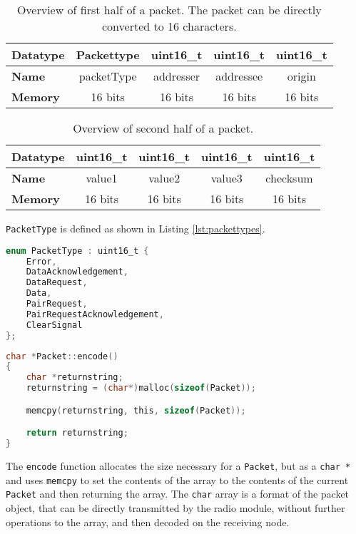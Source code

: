 \begin{table}[]
\centering
\begin{tabular}{|l|c|l|c|l|c|l|c|l|}
\hline
\textbf{Datatype} & \multicolumn{2}{c|}{Packettype}      & \multicolumn{2}{c|}{uint16\_t}       & \multicolumn{2}{c|}{uint16\_t}       & \multicolumn{2}{c|}{uint16\_t}       \\ \hline
\textbf{Name}     & \multicolumn{2}{c|}{packetType}      & \multicolumn{2}{c|}{addresser}       & \multicolumn{2}{c|}{addressee}       & \multicolumn{2}{c|}{origin}          \\ \hline
\textbf{Memory}   & \multicolumn{2}{c|}{16 bits} & \multicolumn{2}{c|}{16 bits} & \multicolumn{2}{c|}{16 bits} & \multicolumn{2}{c|}{16 bits} \\ \hline
\end{tabular}
\caption{Overview of first half of a packet. The packet can be directly converted to 16 characters.}
\label{tab:packetTableFirst}
\end{table}

\begin{table}[]
\centering
\begin{tabular}{|l|c|l|c|l|c|l|c|l|}
\hline
\textbf{Datatype} & \multicolumn{2}{c|}{uint16\_t}       & \multicolumn{2}{c|}{uint16\_t}       & \multicolumn{2}{l|}{uint16\_t} & \multicolumn{2}{c|}{uint16\_t}       \\ \hline
\textbf{Name}     & \multicolumn{2}{c|}{value1}         & \multicolumn{2}{c|}{value2}         & \multicolumn{2}{c|}{value3}   & \multicolumn{2}{c|}{checksum}        \\ \hline
\textbf{Memory}   & \multicolumn{2}{c|}{16 bits} & \multicolumn{2}{c|}{16 bits} & \multicolumn{2}{c|}{16 bits} & \multicolumn{2}{c|}{16 bits} \\ \hline
\end{tabular}
\caption{Overview of second half of a packet.}
\label{tab:packetTableSecond}
\end{table}

\texttt{PacketType} is defined as shown in Listing \ref{lst:packettypes}.
\begin{lstlisting}[language=C,label={lst:packettypes},caption={Packet types}]
enum PacketType : uint16_t {
    Error,
    DataAcknowledgement,
    DataRequest,
    Data,
    PairRequest,
    PairRequestAcknowledgement,
    ClearSignal
};
\end{lstlisting}

\begin{lstlisting}[language=C]
char *Packet::encode()
{
    char *returnstring;
    returnstring = (char*)malloc(sizeof(Packet));

    memcpy(returnstring, this, sizeof(Packet));

    return returnstring;
}
\end{lstlisting}
The \texttt{encode} function allocates the size necessary for a \texttt{Packet}, but as a \texttt{char *} and uses \texttt{memcpy} to set the contents of the array to the contents of the current \texttt{Packet} and then returning the array. The \texttt{char} array is a format of the packet object, that can be directly transmitted by the radio module, without further operations to the array, and then decoded on the receiving node.

